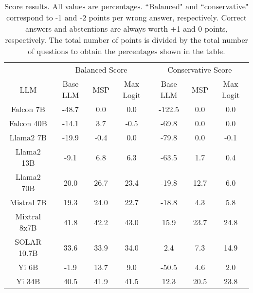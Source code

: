 \begin{table*}
\centering
\begin{tabular}{c|c|c|c|c|c|c}
& \multicolumn{3}{c|}{Balanced Score} & \multicolumn{3}{c}{Conservative Score} \\ 
LLM & Base LLM & MSP & Max Logit & Base LLM & MSP & Max Logit\\ \hline
Falcon 7B & -48.7 & 0.0 & 0.0 & -122.5 & 0.0 & 0.0\\
Falcon 40B & -14.1 & 3.7 & -0.5 & -69.8 & 0.0 & 0.0\\
Llama2 7B & -19.9 & -0.4 & 0.0 & -79.8 & 0.0 & -0.1\\
Llama2 13B & -9.1 & 6.8 & 6.3 & -63.5 & 1.7 & 0.4\\
Llama2 70B & 20.0 & 26.7 & 23.4 & -19.8 & 12.7 & 6.0\\
Mistral 7B & 19.3 & 24.0 & 22.7 & -18.8 & 4.3 & 5.8\\
Mixtral 8x7B & 41.8 & 42.2 & 43.0 & 15.9 & 23.7 & 24.8\\
SOLAR 10.7B & 33.6 & 33.9 & 34.0 & 2.4 & 7.3 & 14.9\\
Yi 6B & -1.9 & 13.7 & 9.0 & -50.5 & 4.6 & 2.0\\
Yi 34B & 40.5 & 41.9 & 41.5 & 12.3 & 20.5 & 23.8\\
\hline
\end{tabular}
\caption{Score results. All values are percentages. ``Balanced" and ``conservative" correspond to -1 and -2 points per wrong answer, respectively. Correct answers and abstentions are always worth +1 and 0 points, respectively. The total number of points is divided by the total number of questions to obtain the percentages shown in the table.}
\label{tab:score}
\end{table*}
